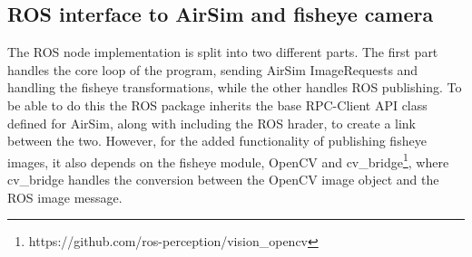         
        

\subsection{ROS interface to AirSim and fisheye camera}\label{subsec:ROS_interface}

The ROS node implementation is split into two different parts. The first part handles the core loop of the program, sending AirSim ImageRequests and handling the fisheye transformations, while the other handles ROS publishing. To be able to do this the ROS package inherits the base RPC-Client API class defined for AirSim, along with including the ROS hrader, to create a link between the two. However, for the added functionality of publishing fisheye images, it also depends on the fisheye module, OpenCV and cv\_bridge\footnote{https://github.com/ros-perception/vision\_opencv}, where cv\_bridge handles the conversion between the OpenCV image object and the ROS image message.

